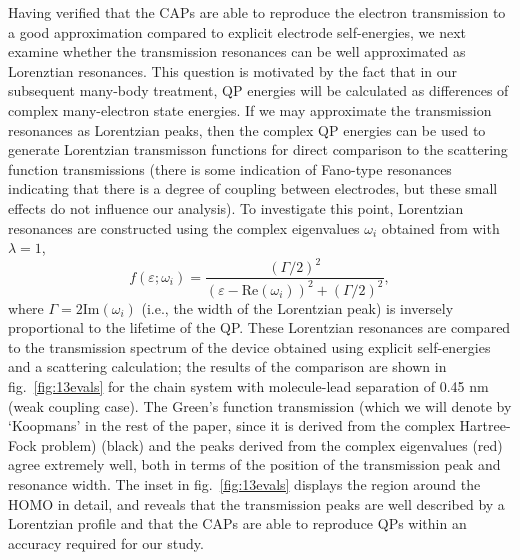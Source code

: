 Having verified that the \acp{CAP} are able to reproduce the electron
transmission to a good approximation compared to explicit
electrode self-energies, we next examine whether the transmission resonances
can be well approximated as Lorenztian resonances. This question is
motivated by the fact that in our subsequent many-body treatment,
\ac{QP} energies will be calculated as differences of complex
many-electron state energies. If we may approximate the transmission
resonances as Lorentzian peaks, then the complex \ac{QP} energies 
can be used to generate Lorentzian transmisson functions for direct
comparison to the scattering function transmissions (there is some
indication of Fano-type resonances indicating that there is a degree of
coupling between electrodes, but these small effects do not influence
our analysis). To investigate this point, Lorentzian  resonances are
constructed using the complex eigenvalues $\omega_i$ obtained from
 with $\lambda=1$, 
\begin{equation}
        f(\varepsilon;\omega_i)
        = \frac{\left( \Gamma/2 \right)^2}
               {(\varepsilon - \mathrm{Re}(\omega_i))^2
               + \left( \Gamma/2 \right)^2},
        \label{eq:lobro}
\end{equation}
where $\Gamma = 2 \mathrm{Im}(\omega_i)$ (i.e., the width of the
Lorentzian peak) is inversely proportional to the lifetime of the
\ac{QP}. These Lorentzian resonances are compared to the transmission
spectrum of the device obtained using explicit self-energies and a
scattering calculation; the results of the comparison are shown in
fig.~\ref{fig:13evals} for the chain system with molecule-lead separation
of 0.45 nm (weak coupling case). The Green's function transmission (which
we will denote by `Koopmans' in the rest of the paper, since it is derived
from the complex Hartree-Fock problem) (black) and the peaks derived
from the complex eigenvalues (red) agree extremely well, both in terms
of the position of the transmission peak and resonance width. The inset
in fig.~\ref{fig:13evals} displays the region around the \ac{HOMO} in
detail, and reveals that the transmission peaks are well described by a
Lorentzian profile and that the CAPs are able to reproduce \acp{QP}
within an accuracy required for our study.

